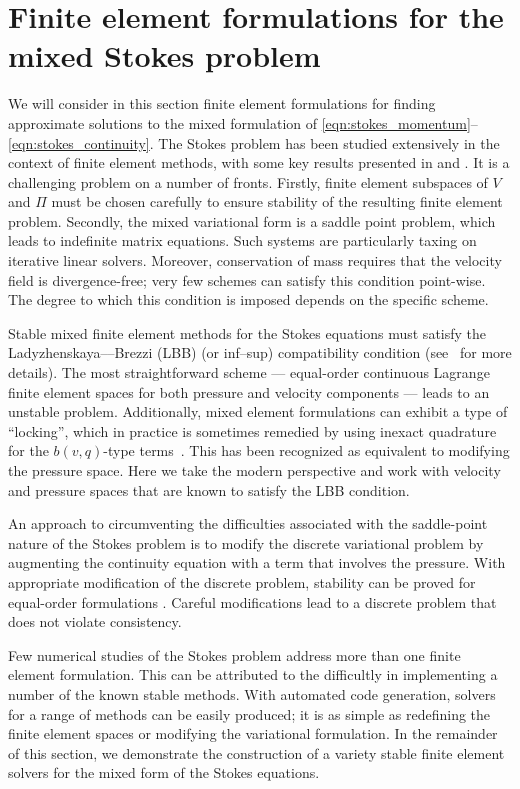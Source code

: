 \section{Finite element formulations for the mixed Stokes problem}

We will consider in this section finite element formulations
for finding approximate solutions to the mixed formulation of
\eqref{eqn:stokes_momentum}--\eqref{eqn:stokes_continuity}.  The Stokes
problem has been studied extensively in the context of finite element
methods, with some key results presented in \citet{BrezziFortin1991}
and \citet{BrennerScott2008}.  It is a challenging problem on a number
of fronts.  Firstly, finite element subspaces of $V$ and $\Pi$ must be
chosen carefully to ensure stability of the resulting finite element
problem. Secondly, the mixed variational form is a saddle point problem,
which leads to indefinite matrix equations. Such systems are particularly
taxing on iterative linear solvers.  Moreover, conservation of mass
requires that the velocity field is divergence-free; very few schemes can
satisfy this condition point-wise.  The degree to which this condition
is imposed depends on the specific scheme.

Stable mixed finite element methods for the Stokes equations must satisfy the
Ladyzhenskaya--\babuska--Brezzi (LBB) (or inf--sup) compatibility condition
(see~\citet{BrezziFortin1991} for more details).  The most straightforward
scheme --- equal-order continuous Lagrange finite element spaces for both
pressure and velocity components --- leads to an unstable problem.
Additionally, mixed element formulations can exhibit a type of ``locking'',
which in practice is sometimes remedied by using inexact quadrature for the
$b(v, q)$-type terms~\citep{EngelmanSaniGreshoBercovier1982}.  This has been
recognized as equivalent to modifying the pressure space.  Here we take the
modern perspective and work with velocity and pressure spaces that are known to
satisfy the LBB condition.

An approach to circumventing the difficulties associated with the
saddle-point nature of the Stokes problem is to modify the discrete
variational problem by augmenting the continuity equation with a
term that involves the pressure. With appropriate modification of the
discrete problem, stability can be proved for equal-order formulations
\citep{HughesFrancaBalestra1986}.  Careful modifications lead to a
discrete problem that does not violate consistency.

Few numerical studies of the Stokes problem address more than one
finite element formulation. This can be attributed to the difficultly
in implementing a number of the known stable methods. With automated
code generation, solvers for a range of methods can be easily produced;
it is as simple as redefining the finite element spaces or modifying
the variational formulation.  In the remainder of this section, we
demonstrate the construction of a variety stable finite element solvers
for the mixed form of the Stokes equations.

